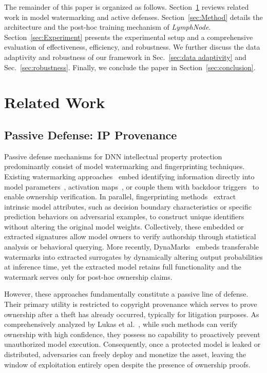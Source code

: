 \documentclass[conference]{IEEEtran}
\begin{document}
The remainder of this paper is organized as follows. Section~\ref{sec:related_work} reviews related work in model watermarking and active defenses. Section~\ref{sec:Method} details the architecture and the post-hoc training mechanism of \textit{LymphNode}. Section~\ref{sec:Experiment} presents the experimental setup and a comprehensive evaluation of effectiveness, efficiency, and robustness. We further discuss the data adaptivity and robustness of our framework in Sec.~\ref{sec:data adaptivity} and Sec.~\ref{sec:robustness}. Finally, we conclude the paper in Section~\ref{sec:conclusion}.

\section{Related Work}
\label{sec:related_work}

\subsection{Passive Defense: IP Provenance}
Passive defense mechanisms for DNN intellectual property protection predominantly consist of model watermarking and fingerprinting techniques. Existing watermarking approaches~\cite{uchida2017embedding,adi2018turning,rouhani2019deepsigns} embed identifying information directly into model parameters~\cite{uchida2017embedding}, activation maps~\cite{rouhani2019deepsigns}, or couple them with backdoor triggers~\cite{adi2018turning,li2022untargeted,guo2023domain} to enable ownership verification. In parallel, fingerprinting methods~\cite{cao2021ipguard,lemerrer2020adversarial} extract intrinsic model attributes, such as decision boundary characteristics or specific prediction behaviors on adversarial examples, to construct unique identifiers without altering the original model weights. Collectively, these embedded or extracted signatures allow model owners to verify authorship through statistical analysis or behavioral querying. More recently, DynaMarks~\cite{chakraborty2022dynamarks} embeds transferable watermarks into extracted surrogates by dynamically altering output probabilities at inference time, yet the extracted model retains full functionality and the watermark serves only for post-hoc ownership claims.

However, these approaches fundamentally constitute a passive line of defense. Their primary utility is restricted to copyright provenance which serves to prove ownership after a theft has already occurred, typically for litigation purposes. As comprehensively analyzed by Lukas et al.~\cite{lukas2022sok}, while such methods can verify ownership with high confidence, they possess no capability to proactively prevent unauthorized model execution. Consequently, once a protected model is leaked or distributed, adversaries can freely deploy and monetize the asset, leaving the window of exploitation entirely open despite the presence of ownership proofs.
\end{document}
